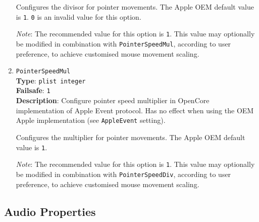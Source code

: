 \documentclass[]{article}
\begin{document}
\begin{enumerate}
  Configures the divisor for pointer movements. The Apple OEM default value is \texttt{1}.
  \texttt{0} is an invalid value for this option.

  \emph{Note}: The recommended value for this option is \texttt{1}. This value may
  optionally be modified in combination with \texttt{PointerSpeedMul}, according to user
  preference, to achieve customised mouse movement scaling.

\item
  \texttt{PointerSpeedMul}\\
  \textbf{Type}: \texttt{plist\ integer}\\
  \textbf{Failsafe}: \texttt{1}\\
  \textbf{Description}: Configure pointer speed multiplier in OpenCore implementation
  of Apple Event protocol.
  Has no effect when using the OEM Apple implementation (see \texttt{AppleEvent} setting).

  Configures the multiplier for pointer movements. The Apple OEM default value is \texttt{1}.

  \emph{Note}: The recommended value for this option is \texttt{1}. This value may
  optionally be modified in combination with \texttt{PointerSpeedDiv}, according to user
  preference, to achieve customised mouse movement scaling.

\end{enumerate}

\subsection{Audio Properties}\label{uefiaudioprops}
\end{document}
